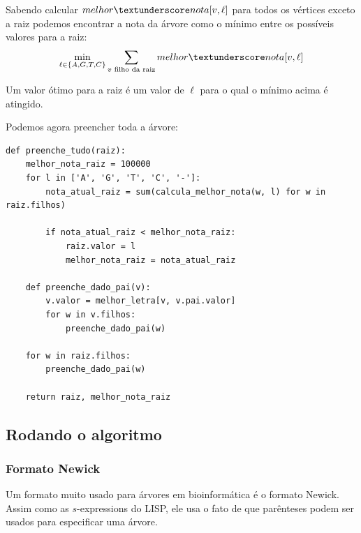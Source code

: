 \documentclass[11pt]{article}
\newcommand{\tu}{\textunderscore}
\begin{document}
Sabendo calcular $melhor \tu nota[v, \ell]$ para todos os vértices
exceto a raiz podemos encontrar a nota da árvore como o mínimo entre
os possíveis valores para a raiz:
\[ \min_{\ell \in \{A, G, T, C\}} \sum_{v \text{ filho da raiz}}
melhor \tu nota[v, \ell]\]

Um valor ótimo para a raiz é um valor de $\ell$ para o qual o mínimo
acima é atingido.


Podemos agora preencher toda a árvore:
\begin{verbatim}
def preenche_tudo(raiz):
    melhor_nota_raiz = 100000
    for l in ['A', 'G', 'T', 'C', '-']:
        nota_atual_raiz = sum(calcula_melhor_nota(w, l) for w in raiz.filhos)

        if nota_atual_raiz < melhor_nota_raiz:
            raiz.valor = l
            melhor_nota_raiz = nota_atual_raiz

    def preenche_dado_pai(v):
        v.valor = melhor_letra[v, v.pai.valor]
        for w in v.filhos:
            preenche_dado_pai(w)

    for w in raiz.filhos:
        preenche_dado_pai(w)

    return raiz, melhor_nota_raiz
\end{verbatim}

\subsection{Rodando o algoritmo}
\label{sec-4-3}

\subsubsection{Formato Newick}
\label{sec-4-3-1}

Um formato muito usado para árvores em bioinformática é o formato
Newick. Assim como as $s$-expressions do LISP, ele usa o fato de que
parênteses podem ser usados para especificar uma árvore.
\end{document}
